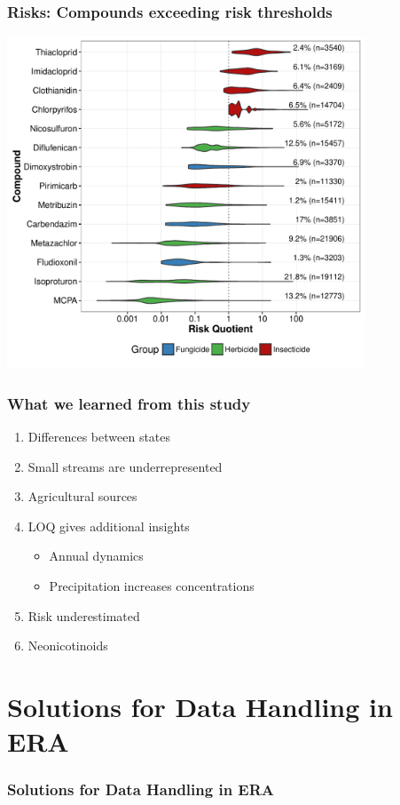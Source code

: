 \documentclass[
	10pt
	]{beamer}
\begin{document}
\begin{frame}
\frametitle{Risks: Compounds exceeding risk thresholds}
	\includegraphics[width = 0.8\textwidth]{figs/compounds.pdf}
\end{frame}


\begin{frame}
\frametitle{What we learned from this study}
	\begin{enumerate}
		\item Differences between \alert{states}
		\item Small streams are \alert{underrepresented}
		\item \alert{Agricultural} sources
		\item \alert{LOQ} gives additional insights
			\begin{itemize}
				\item Annual \alert{dynamics}
				\item \alert{Precipitation} increases concentrations
			\end{itemize}
		\item Risk \alert{underestimated} 
		\item \alert{Neonicotinoids} 
	\end{enumerate}
\end{frame}



\section{Solutions for Data Handling in ERA}
\begin{frame}[noframenumbering]
\frametitle{Solutions for Data Handling in ERA}
 \resizebox{11.5cm}{!}{%
				
				}
\end{frame}
\end{document}

